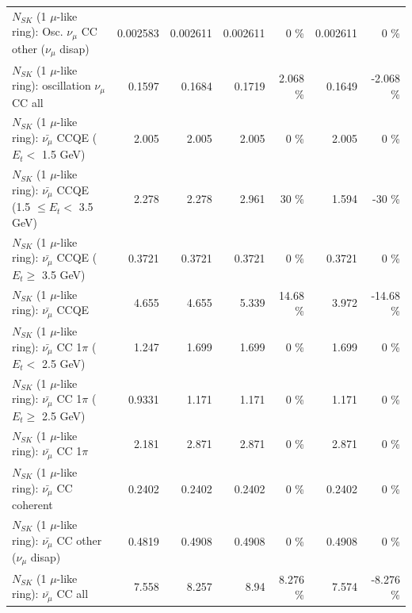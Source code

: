 \begin{table}
\begin{tabular}{| l | r | r | r  r | r  r |}
         $N_{SK}$ (1 $\mu$-like ring): Osc. $\nu_\mu$ CC other ($\nu_\mu$ disap) &        0.002583 &        0.002611 &        0.002611 &        0 \%  &        0.002611 &        0 \%  \\ 
                      $N_{SK}$ (1 $\mu$-like ring): oscillation $\nu_\mu$ CC all &          0.1597 &          0.1684 &          0.1719 &    2.068 \%  &          0.1649 &   -2.068 \%  \\ 
\hline
\hline
          $N_{SK}$ (1 $\mu$-like ring): $\bar{\nu_\mu}$ CCQE ($E_{t} <$ 1.5 GeV) &           2.005 &           2.005 &           2.005 &        0 \%  &           2.005 &        0 \%  \\ 
 $N_{SK}$ (1 $\mu$-like ring): $\bar{\nu_\mu}$ CCQE (1.5 $\leq E_{t} <$ 3.5 GeV) &           2.278 &           2.278 &           2.961 &       30 \%  &           1.594 &      -30 \%  \\ 
       $N_{SK}$ (1 $\mu$-like ring): $\bar{\nu_\mu}$ CCQE ($E_{t} \geq$ 3.5 GeV) &          0.3721 &          0.3721 &          0.3721 &        0 \%  &          0.3721 &        0 \%  \\ 
\hline
                              $N_{SK}$ (1 $\mu$-like ring): $\bar{\nu_\mu}$ CCQE &           4.655 &           4.655 &           5.339 &    14.68 \%  &           3.972 &   -14.68 \%  \\ 
\hline
     $N_{SK}$ (1 $\mu$-like ring): $\bar{\nu_\mu}$ CC 1$\pi$ ($E_{t} <$ 2.5 GeV) &           1.247 &           1.699 &           1.699 &        0 \%  &           1.699 &        0 \%  \\ 
  $N_{SK}$ (1 $\mu$-like ring): $\bar{\nu_\mu}$ CC 1$\pi$ ($E_{t} \geq$ 2.5 GeV) &          0.9331 &           1.171 &           1.171 &        0 \%  &           1.171 &        0 \%  \\ 
\hline
                         $N_{SK}$ (1 $\mu$-like ring): $\bar{\nu_\mu}$ CC 1$\pi$ &           2.181 &           2.871 &           2.871 &        0 \%  &           2.871 &        0 \%  \\ 
                       $N_{SK}$ (1 $\mu$-like ring): $\bar{\nu_\mu}$ CC coherent &          0.2402 &          0.2402 &          0.2402 &        0 \%  &          0.2402 &        0 \%  \\ 
        $N_{SK}$ (1 $\mu$-like ring): $\bar{\nu_\mu}$ CC other ($\nu_\mu$ disap) &          0.4819 &          0.4908 &          0.4908 &        0 \%  &          0.4908 &        0 \%  \\ 
                          $N_{SK}$ (1 $\mu$-like ring): $\bar{\nu_{\mu}}$ CC all &           7.558 &           8.257 &            8.94 &    8.276 \%  &           7.574 &   -8.276 \%  \\ 

\end{tabular}
\end{table}
